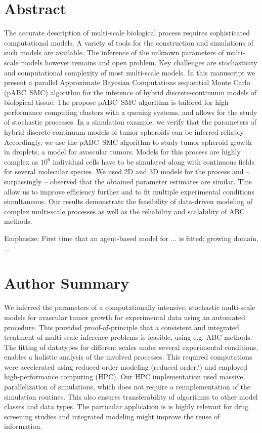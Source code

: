 \documentclass[10pt,letterpaper]{article}
\newcommand{\jh}[1]{{\color{red}#1}}
\newcommand{\nj}[1]{{\color{blue}#1}}
\begin{document}
\tableofcontents

\section*{Abstract}
The accurate description of multi-scale biological process requires sophisticated computational models. A variety of tools for the construction and simulations of such models are available. The inference of the unknown parameters of multi-scale models however remains and open problem. Key challenges are stochasticity and computational complexity of most multi-scale models. In this manuscript we present a parallel Approximate Bayesian Computations sequential Monte Carlo (pABC~SMC) algorithm for the inference of hybrid discrete-continuum models of biological tissue. The propose pABC~SMC algorithm is tailored for high-performance computing clusters with a queuing systems, and allows for the study of stochastic processes. In a simulation example, we verify that the parameters of hybrid discrete-continuum models of tumor spheroids can be inferred reliably. Accordingly, we use the pABC~SMC algorithm to study tumor spheroid growth in droplets, a model for avascular tumors. Models for this process are highly complex as $10^6$ individual cells have to be simulated along with continuous fields for several molecular species. We used 2D and 3D models for the process and -- surpassingly -- observed that the obtained parameter estimates are similar. This allow us to improve efficiency further and to fit multiple experimental conditions simultaneous. Our results demonstrate the feasibility of data-driven modeling of complex multi-scale processes as well as the reliability and scalability of ABC methods.

\jh{Emphasize: First time that an agent-based model for ... is fitted; growing domain, ...}

\section*{Author Summary}
We inferred the parameters of a computationally intensive, stochastic multi-scale models for avascular tumor growth for experimental data using an automated procedure. This provided proof-of-principle that a consistent and integrated treatment of multi-scale inference problems is feasible, using e.g. ABC methods. The fitting of datatypes for different scales under several experimental conditions, enables a holistic analysis of the involved processes. This required computations were accelerated using reduced order modeling \nj{(reduced order?)} and employed high-performance computing (HPC). Our HPC implementation used massive parallelization of simulations, which does not require a reimplementation of the simulation routines. This also ensures transferability of algorithms to other model classes and data types. The particular application is is highly relevant for drug screening studies and integrated modeling might improve the reuse of information.
\end{document}
